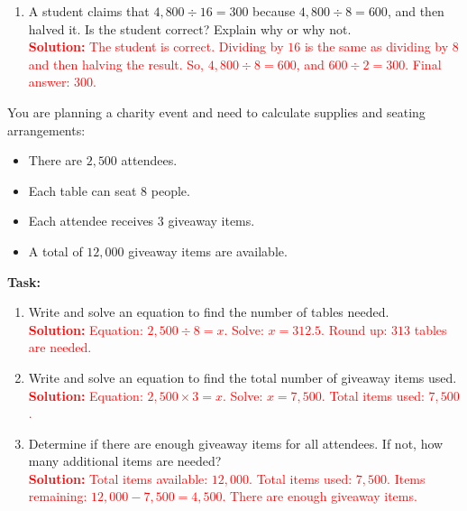 \documentclass[12pt]{article}
\begin{document}
\begin{tcolorbox}[colframe=black!60, colback=white, 
coltitle=black, colbacktitle=black!15, fonttitle=\bfseries\Large, 
title=Problems, halign title=center, left=10pt, right=10pt, top=10pt, bottom=100pt]
\begin{enumerate}[start=9, itemsep=3em]
    \item A student claims that \( 4,800 \div 16 = 300 \) because \( 4,800 \div 8 = 600 \), and then halved it. Is the student correct? Explain why or why not.\\
    \textcolor{red}{\textbf{Solution:} The student is correct. Dividing by \(16\) is the same as dividing by \(8\) and then halving the result. So, \(4,800 \div 8 = 600\), and \(600 \div 2 = 300\). Final answer: \(300\).}
\end{enumerate}
\end{tcolorbox}

\vspace{1em}

\begin{tcolorbox}[colframe=black!60, colback=white, 
coltitle=black, colbacktitle=black!15, fonttitle=\bfseries\Large, 
title=Performance Task: Planning a Charity Event, halign title=center, left=10pt, right=10pt, top=10pt, bottom=100pt]
You are planning a charity event and need to calculate supplies and seating arrangements:
\begin{itemize}
    \item There are \( 2,500 \) attendees.
    \item Each table can seat \( 8 \) people.
    \item Each attendee receives \( 3 \) giveaway items.
    \item A total of \( 12,000 \) giveaway items are available.
\end{itemize}
\textbf{Task:}
\begin{enumerate}[itemsep=4em]
    \item Write and solve an equation to find the number of tables needed.\\
    \textcolor{red}{\textbf{Solution:} Equation: \(2,500 \div 8 = x\). Solve: \(x = 312.5\). Round up: \(313\) tables are needed.}

    \item Write and solve an equation to find the total number of giveaway items used.\\
    \textcolor{red}{\textbf{Solution:} Equation: \(2,500 \times 3 = x\). Solve: \(x = 7,500\). Total items used: \(7,500\).}

    \item Determine if there are enough giveaway items for all attendees. If not, how many additional items are needed?\\
    \textcolor{red}{\textbf{Solution:} Total items available: \(12,000\). Total items used: \(7,500\). Items remaining: \(12,000 - 7,500 = 4,500\). There are enough giveaway items.}
\end{enumerate}
\end{tcolorbox}
\end{document}
